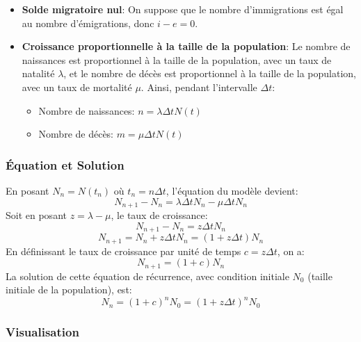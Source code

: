 \documentclass[oneside]{book}
\begin{document}
\begin{itemize}
    \item \textbf{Solde migratoire nul}: On suppose que le nombre d'immigrations est égal au nombre d'émigrations, donc $i - e = 0$.
    \item \textbf{Croissance proportionnelle à la taille de la population}: Le nombre de naissances est proportionnel à la taille de la population, avec un taux de natalité $\lambda$, et le nombre de décès est proportionnel à la taille de la population, avec un taux de mortalité $\mu$. Ainsi, pendant l'intervalle $\Delta t$:
    \begin{itemize}
        \item Nombre de naissances: $n = \lambda \Delta t N(t)$
        \item Nombre de décès: $m = \mu \Delta t N(t)$
    \end{itemize}
\end{itemize}

\subsubsection{Équation et Solution}

En posant $N_n = N(t_n)$ où $t_n = n \Delta t$, l'équation du modèle devient:
\[
N_{n+1} - N_n = \lambda \Delta t N_n - \mu \Delta t N_n
\]
Soit en posant $z = \lambda - \mu$, le taux de croissance:
\[
N_{n+1} - N_n = z \Delta t N_n
\]
\[
N_{n+1} = N_n + z \Delta t N_n = (1 + z \Delta t) N_n
\]
En définissant le taux de croissance par unité de temps $c = z \Delta t$, on a:
\[
N_{n+1} = (1 + c) N_n
\]
La solution de cette équation de récurrence, avec condition initiale $N_0$ (taille initiale de la population), est:
\[
N_n = (1 + c)^n N_0 = (1 + z \Delta t)^n N_0
\]

\subsubsection{Visualisation}
\end{document}
